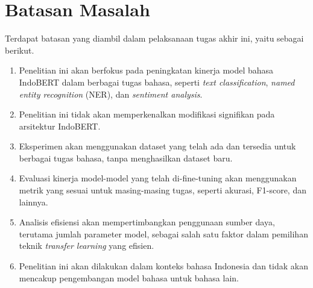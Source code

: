 \section{Batasan Masalah}
\label{sec:batasan-masalah}

Terdapat batasan yang diambil dalam pelaksanaan tugas akhir ini, yaitu sebagai berikut.

\begin{enumerate}
    \item Penelitian ini akan berfokus pada peningkatan kinerja model bahasa IndoBERT dalam berbagai tugas bahasa, seperti \textit{text classification},  \textit{named entity recognition} (NER), dan \textit{sentiment analysis}.
    \item Penelitian ini tidak akan memperkenalkan modifikasi signifikan pada arsitektur IndoBERT.
    \item Eksperimen akan menggunakan dataset yang telah ada dan tersedia untuk berbagai tugas bahasa, tanpa menghasilkan dataset baru.
    \item Evaluasi kinerja model-model yang telah di-fine-tuning akan menggunakan metrik yang sesuai untuk masing-masing tugas, seperti akurasi, F1-score, dan lainnya.
    \item Analisis efisiensi akan mempertimbangkan penggunaan sumber daya, terutama jumlah parameter model, sebagai salah satu faktor dalam pemilihan teknik \textit{transfer learning} yang efisien.
    \item Penelitian ini akan dilakukan dalam konteks bahasa Indonesia dan tidak akan mencakup pengembangan model bahasa untuk bahasa lain.
\end{enumerate}
